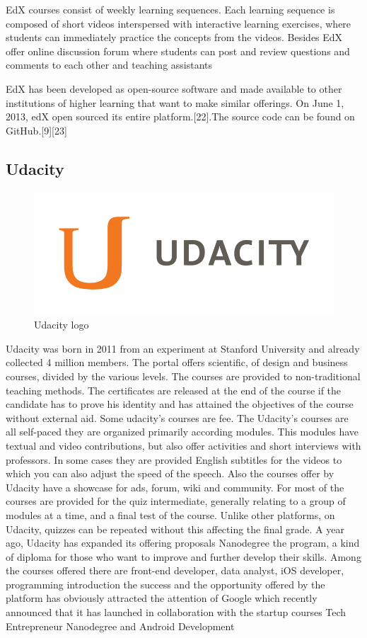 EdX courses consist of weekly learning sequences. Each learning sequence is composed of short videos interspersed with interactive learning exercises, where students can immediately practice the concepts from the videos.
Besides EdX offer online discussion forum where students can post and review questions and comments to each other and teaching assistants

EdX has been developed as open-source software and made available to other institutions of higher learning that want to make similar offerings. On June 1, 2013, edX open sourced its entire platform.[22].The source code can be found on GitHub.[9][23]


\subsection{Udacity}
\label{subsec:udacity}
\begin{figure}[htb] %
 \centering
 \includegraphics[width=0.5\linewidth]{images/chapter1/udacity.png}\hfill
 \caption[Udacity logo]{Udacity logo}
 \label{fig:fourV}
\end{figure}

Udacity was born in 2011 from an experiment at Stanford University and already collected 4 million members. The portal offers scientific, of design and business courses, divided by the various levels. The courses are provided to non-traditional teaching methods.
The certificates are released at the end of the course if the candidate has to prove his identity and has attained the objectives of the course without external aid. Some udacity's courses are fee.
The Udacity’s courses are all self-paced they are organized primarily according modules. This modules have textual and video contributions, but also offer activities and short interviews with professors. In some cases they are provided English subtitles for the videos to which you can also adjust the speed of the speech.
Also the courses offer by Udacity have a showcase for ads, forum, wiki and community. For most of the courses are provided for the quiz intermediate, generally relating to a group of modules at a time, and a final test of the course. Unlike other platforms, on Udacity, quizzes can be repeated without this affecting the final grade.
A year ago, Udacity has expanded its offering proposals Nanodegree the program, a kind of diploma for those who want to improve and further develop their skills. Among the courses offered there are front-end developer, data analyst, iOS developer, programming introduction
the success and the opportunity offered by the platform has obviously attracted the attention of Google which recently announced that it has launched in collaboration with the startup courses Tech Entrepreneur Nanodegree and Android Development

